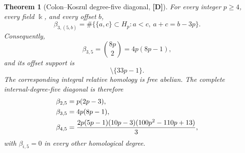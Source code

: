 \documentclass[11pt]{article}
\newtheorem{theorem}{Theorem}[section]
\theoremstyle{definition}
\theoremstyle{remark}
\newcommand{\kfield}{\Bbbk}
\begin{document}
\begin{theorem}[Colon--Koszul degree-five diagonal, {\bf[D]}]
\label{thm:colon-koszul-diagonal}
For every integer \(p\ge4\), every field \(\kfield\), and every offset \(b\),
\begin{equation}
\beta_{3,(5,b)}=
\#\bigl\{\{a,c\}\subset H_p:a<c,\ a+c=b-3p\bigr\}.
\label{eq:colon-koszul-profile}
\end{equation}
Consequently,
\begin{equation}
\beta_{3,5}=\binom{8p}{2}=4p(8p-1),
\label{eq:beta-three-five}
\end{equation}
and its offset support is
\begin{equation}
[15p+1,39p-3]\setminus\{33p-1\}.
\label{eq:colon-koszul-support}
\end{equation}
The corresponding integral relative homology is free abelian. The complete internal-degree-five
diagonal is therefore
\begin{align}
\beta_{2,5}&=p(2p-3),\notag\\
\beta_{3,5}&=4p(8p-1),\label{eq:degree-five-diagonal}\\
\beta_{4,5}&=\frac{2p(5p-1)(10p-3)(100p^2-110p+13)}{3},\notag
\end{align}
with \(\beta_{i,5}=0\) in every other homological degree.
\end{theorem}
\end{document}
